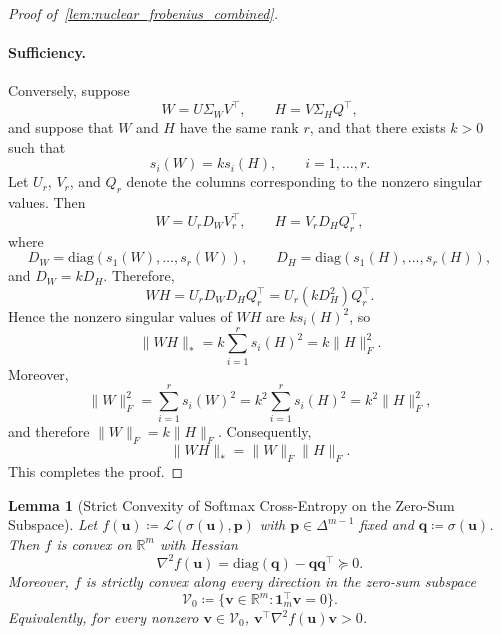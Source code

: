 \documentclass[11pt]{article}
\newtheorem{lemma}{Lemma}
\begin{document}
\begin{proof}[Proof of~\cref{lem:nuclear_frobenius_combined}]
  \paragraph{Sufficiency.}
  Conversely, suppose
  \[
  W = U \Sigma_W V^\top, \qquad H = V \Sigma_H Q^\top,
  \]
  and suppose that \(W\) and \(H\) have the same rank \(r\), and that there exists \(k>0\) such that
  \[
  s_i(W) = k s_i(H), \qquad i = 1, \dots, r.
  \]
  Let \(U_r\), \(V_r\), and \(Q_r\) denote the columns corresponding to the nonzero singular values. Then
  \[
  W = U_r D_W V_r^\top, \qquad H = V_r D_H Q_r^\top,
  \]
  where
  \[
  D_W = \mathrm{diag}(s_1(W), \dots, s_r(W)), \qquad
  D_H = \mathrm{diag}(s_1(H), \dots, s_r(H)),
  \]
  and \(D_W = k D_H\). Therefore,
  \[
  WH = U_r D_W D_H Q_r^\top = U_r (k D_H^2) Q_r^\top.
  \]
  Hence the nonzero singular values of \(WH\) are \(k s_i(H)^2\), so
  \[
  \|WH\|_* = k \sum_{i=1}^r s_i(H)^2 = k \|H\|_F^2.
  \]
  Moreover,
  \[
  \|W\|_F^2 = \sum_{i=1}^r s_i(W)^2 = k^2 \sum_{i=1}^r s_i(H)^2 = k^2 \|H\|_F^2,
  \]
  and therefore \(\|W\|_F = k \|H\|_F\). Consequently,
  \[
  \|WH\|_* = \|W\|_F \|H\|_F.
  \]
  This completes the proof.
\end{proof}

\begin{lemma}[Strict Convexity of Softmax Cross-Entropy on the Zero-Sum Subspace]
\label{lem:softmax_ce_strict_convexity_V0}
Let \(f(\boldsymbol u) \coloneqq \mathcal L(\sigma(\boldsymbol u), \boldsymbol p)\)
with \(\boldsymbol p\in\Delta^{m-1}\) fixed and \(\boldsymbol q \coloneqq \sigma(\boldsymbol u)\).
Then \(f\) is convex on \(\mathbb R^m\) with Hessian
\[
\nabla^2 f(\boldsymbol u)   =   \mathrm{diag}(\boldsymbol q) - \boldsymbol q \boldsymbol q^\top \succeq 0.
\]
Moreover, \(f\) is strictly convex along every direction in the zero-sum subspace
\[
\mathcal V_0 \coloneqq \{\boldsymbol v\in\mathbb R^m : \boldsymbol{1}_m^\top \boldsymbol v = 0 \}.
\]
Equivalently, for every nonzero \(\boldsymbol v\in \mathcal V_0\),
\(\boldsymbol v^\top \nabla^2 f(\boldsymbol u)   \boldsymbol v > 0\).
\end{lemma}
\end{document}
